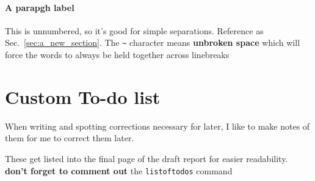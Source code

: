 \paragraph{A parapgh label} \label{par:a_parapgh_label}

This is unnumbered, so it's good for simple separations. Reference as Sec.~\ref{sec:a_new_section}. The \texttt{\~} character means \textbf{unbroken space} which will force the words to always be held together across linebreaks


\section{Custom To-do list}
When writing and spotting corrections necessary for later, I like to make notes of them for me to correct them later.


These get listed into the final page of the draft report for easier readability.
\textbf{don't forget to comment out} the \texttt{listoftodos} command
